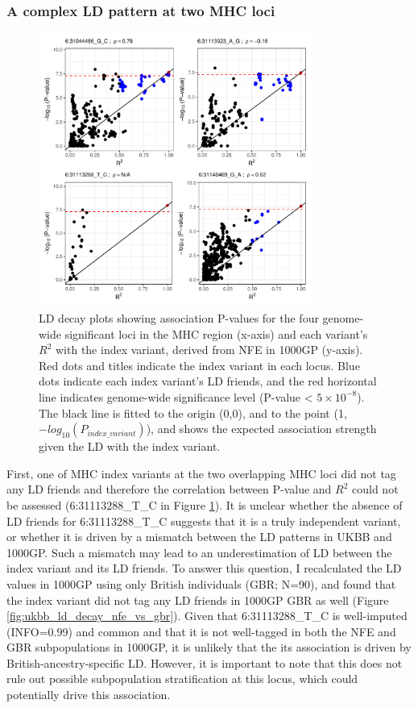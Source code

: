   \subsubsection{A complex LD pattern at two MHC loci}
  \begin{figure}[H] 
    \centering    
    \includegraphics[width=0.8\textwidth]{ukbb_ld_decay_mhc}
    \caption[LD decay plots for the pAD-associated MHC loci in the UKBB analysis]{LD decay plots showing association P-values for the four genome-wide significant loci in the MHC region (x-axis) and each variant's $R^{2}$ with the index variant, derived from NFE in 1000GP (y-axis). Red dots and titles indicate the index variant in each locus. Blue dots indicate each index variant's LD friends, and the red horizontal line indicates genome-wide significance level (P-value < $5\times10^{-8}$). The black line is fitted to the origin (0,0), and to the point (1,$-log_{10}(P_{index\_variant})$), and shows the expected association strength given the LD with the index variant.}
    \label{fig:ukbb_ld_decay_mhc}
    \end{figure}
  First, one of MHC index variants at the two overlapping MHC loci did not tag any LD friends and therefore the correlation between P-value and $R^{2}$ could not be assessed (6:31113288\_T\_C in Figure \ref{fig:ukbb_ld_decay_mhc}). It is unclear whether the absence of LD friends for 6:31113288\_T\_C suggests that it is a truly independent variant, or whether it is driven by a mismatch between the LD patterns in UKBB and 1000GP. Such a mismatch may lead to an underestimation of LD between the index variant and its LD friends. To answer this question, I recalculated the LD values in 1000GP using only British individuals (GBR; N=90), and found that the index variant did not tag any LD friends in 1000GP GBR as well (Figure \ref{fig:ukbb_ld_decay_nfe_vs_gbr}). Given that 6:31113288\_T\_C is well-imputed (INFO=0.99) and common and that it is not well-tagged in both the NFE and GBR subpopulations in 1000GP, it is unlikely that the its association is driven by British-ancestry-specific LD. However, it is important to note that this does not rule out possible subpopulation stratification at this locus, which could potentially drive this association. 

